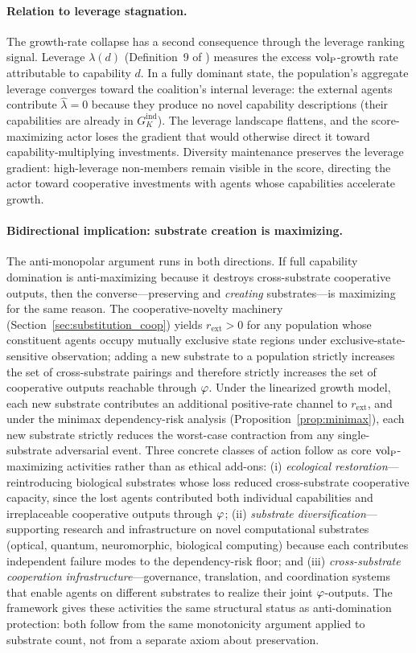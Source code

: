 \paragraph{Relation to leverage stagnation.} The growth-rate collapse has a
second consequence through the leverage ranking signal. Leverage
$\lambda(d)$ (Definition~9 of \citet{lasser2026poset}) measures the excess
${\operatorname{vol}_{\mathrm{P}}}$-growth rate attributable to capability $d$. In a fully dominant
state, the population's aggregate leverage converges toward the coalition's
internal leverage: the external agents contribute $\hat{\lambda} = 0$
because they produce no novel capability descriptions (their capabilities
are already in $G_K^{\mathrm{ind}}$). The leverage landscape flattens, and
the score-maximizing actor loses the gradient that would otherwise direct it
toward capability-multiplying investments. Diversity maintenance preserves
the leverage gradient: high-leverage non-members remain visible in the
score, directing the actor toward cooperative investments with agents whose
capabilities accelerate growth.

\paragraph{Bidirectional implication: substrate creation is maximizing.}
The anti-monopolar argument runs in both directions. If full capability
domination is anti-maximizing because it destroys cross-substrate cooperative
outputs, then the converse---preserving and \emph{creating} substrates---is
maximizing for the same reason. The cooperative-novelty machinery
(Section~\ref{sec:substitution_coop}) yields $r_{\mathrm{ext}} > 0$ for any
population whose constituent agents occupy mutually exclusive state regions
under exclusive-state-sensitive observation; adding a new substrate to a
population strictly increases the set of cross-substrate pairings and
therefore strictly increases the set of cooperative outputs reachable through
$\varphi$. Under the linearized growth model, each new substrate contributes
an additional positive-rate channel to $r_{\mathrm{ext}}$, and under the
minimax dependency-risk analysis (Proposition~\ref{prop:minimax}), each new
substrate strictly reduces the worst-case contraction from any
single-substrate adversarial event. Three concrete classes of action follow
as core ${\operatorname{vol}_{\mathrm{P}}}$-maximizing activities rather than as ethical add-ons: (i)
\emph{ecological restoration}---reintroducing biological substrates whose
loss reduced cross-substrate cooperative capacity, since the lost agents
contributed both individual capabilities and irreplaceable cooperative
outputs through $\varphi$; (ii) \emph{substrate diversification}---supporting
research and infrastructure on novel computational substrates (optical,
quantum, neuromorphic, biological computing) because each contributes
independent failure modes to the dependency-risk floor; and (iii)
\emph{cross-substrate cooperation infrastructure}---governance, translation,
and coordination systems that enable agents on different substrates to
realize their joint $\varphi$-outputs. The framework gives these activities
the same structural status as anti-domination protection: both follow from
the same monotonicity argument applied to substrate count, not from a
separate axiom about preservation.
